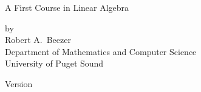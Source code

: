 \begin{center}
{\fontsize{24}{24}\selectfont A First Course in Linear Algebra}
\par
{}
%
{\large by\\Robert A.\ Beezer\\Department of Mathematics and Computer Science\\University of Puget Sound}\par
%
%
%
Version \FCLAversion\par
%
%
\end{center}
